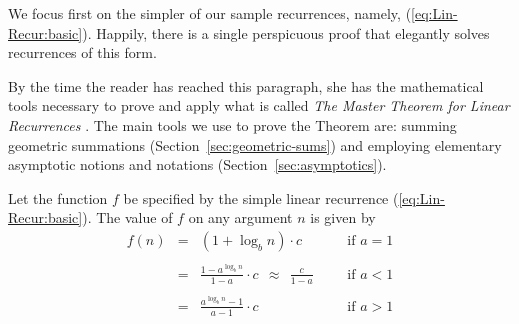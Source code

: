 We focus first on the simpler of our sample recurrences, namely, (\ref{eq:Lin-Recur:basic}).  Happily, there is a single perspicuous proof that elegantly solves recurrences of this form.

\medskip

By the time the reader has reached this paragraph, she has the mathematical tools necessary to prove and apply what is called {\it The Master Theorem for Linear Recurrences} \cite{CLRS}.  The main tools we use to prove the Theorem are: summing geometric summations (Section~\ref{sec:geometric-sums}) and employing elementary asymptotic notions and notations (Section~\ref{sec:asymptotics}).

\begin{theorem}
\label{thm:master-thm-simple}
Let the function $f$ be specified by the simple linear recurrence (\ref{eq:Lin-Recur:basic}).  The value of $f$ on any argument $n$ is given by
\begin{equation}
\label{eq:Lin-Recur:solve}
\begin{array}{lcllll}
f(n) & = & (1 + \log_b n) \cdot c &  &  & \mbox{if } a=1 \\
      &    &                 &  &  & \\
      & = &
  {\displaystyle
  \frac{1-a^{\log_b n}}{1-a} \cdot c \ \ \approx \ \ \frac{c}{1-a}
  }
                               &  &  & \mbox{if } a<1 \\
    &   &                   &  &  & \\
    & = &
  {\displaystyle
\frac{a^{\log_b n} -1}{a-1} \cdot c
  }
                             &  &  & \mbox{if } a>1
\end{array}
\end{equation}
\end{theorem}

